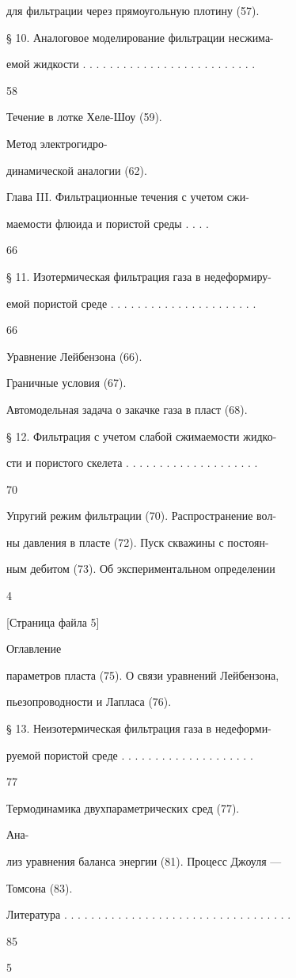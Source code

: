 \documentclass[
  11pt,
]{article}
\begin{document}
для фильтрации через прямоугольную плотину (57).\par
§ 10. Аналоговое моделирование фильтрации несжима-\par
емой жидкости . . . . . . . . . . . . . . . . . . . . . . . . . .\par
58\par
Течение в лотке Хеле-Шоу (59).\par
Метод электрогидро-\par
динамической аналогии (62).\par
Глава III. Фильтрационные течения с учетом сжи-\par
маемости флюида и пористой среды . . . .\par
66\par
§ 11. Изотермическая фильтрация газа в недеформиру-\par
емой пористой среде . . . . . . . . . . . . . . . . . . . . . .\par
66\par
Уравнение Лейбензона (66).\par
Граничные условия (67).\par
Автомодельная задача о закачке газа в пласт (68).\par
§ 12. Фильтрация с учетом слабой сжимаемости жидко-\par
сти и пористого скелета . . . . . . . . . . . . . . . . . . . .\par
70\par
Упругий режим фильтрации (70). Распространение вол-\par
ны давления в пласте (72). Пуск скважины с постоян-\par
ным дебитом (73). Об экспериментальном определении\par
4\par
\smallskip
{[}Страница файла 5{]}\par
Оглавление\par
параметров пласта (75). О связи уравнений Лейбензона,\par
пьезопроводности и Лапласа (76).\par
§ 13. Неизотермическая фильтрация газа в недеформи-\par
руемой пористой среде . . . . . . . . . . . . . . . . . . . .\par
77\par
Термодинамика двухпараметрических сред (77).\par
Ана-\par
лиз уравнения баланса энергии (81). Процесс Джоуля ---\par
Томсона (83).\par
Литература . . . . . . . . . . . . . . . . . . . . . . . . . . . . . . . . . .\par
85\par
5\par
\endgroup
\end{document}
